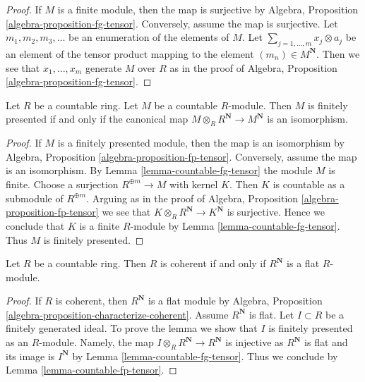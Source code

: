 \begin{proof}
If $M$ is a finite module, then the map is surjective by Algebra, Proposition
\ref{algebra-proposition-fg-tensor}. Conversely, assume the map is surjective.
Let $m_1, m_2, m_3, \ldots$ be an enumeration of the elements of $M$.
Let $\sum_{j = 1, \ldots, m} x_j \otimes a_j$ be an element of the
tensor product mapping to the element $(m_n) \in M^\mathbf{N}$. Then
we see that $x_1, \ldots, x_m$ generate $M$ over $R$ as in the proof of
Algebra, Proposition \ref{algebra-proposition-fg-tensor}.
\end{proof}

\begin{lemma}
\label{lemma-countable-fp-tensor}
Let $R$ be a countable ring. Let $M$ be a countable $R$-module. Then $M$
is finitely presented if and only if the canonical map
$M \otimes_R R^\mathbf{N} \to M^\mathbf{N}$ is an isomorphism.
\end{lemma}

\begin{proof}
If $M$ is a finitely presented module, then the map is an isomorphism
by Algebra, Proposition \ref{algebra-proposition-fp-tensor}. Conversely,
assume the map is an isomorphism. By Lemma \ref{lemma-countable-fg-tensor}
the module $M$ is finite. Choose a surjection $R^{\oplus m} \to M$ with
kernel $K$. Then $K$ is countable as a submodule of $R^{\oplus m}$.
Arguing as in the proof of Algebra, Proposition
\ref{algebra-proposition-fp-tensor} we see that
$K \otimes_R R^\mathbf{N} \to K^\mathbf{N}$ is surjective.
Hence we conclude that $K$ is a finite $R$-module by
Lemma \ref{lemma-countable-fg-tensor}.
Thus $M$ is finitely presented.
\end{proof}

\begin{lemma}
\label{lemma-countable-coherent}
Let $R$ be a countable ring. Then $R$ is coherent if and only if
$R^\mathbf{N}$ is a flat $R$-module.
\end{lemma}

\begin{proof}
If $R$ is coherent, then $R^\mathbf{N}$ is a flat module by
Algebra, Proposition \ref{algebra-proposition-characterize-coherent}.
Assume $R^\mathbf{N}$ is flat. Let $I \subset R$ be a finitely
generated ideal. To prove the lemma we show that $I$ is finitely
presented as an $R$-module. Namely, the map
$I \otimes_R R^\mathbf{N} \to R^\mathbf{N}$ is
injective as $R^\mathbf{N}$ is flat and its image is
$I^\mathbf{N}$ by Lemma \ref{lemma-countable-fg-tensor}.
Thus we conclude by Lemma \ref{lemma-countable-fp-tensor}.
\end{proof}

